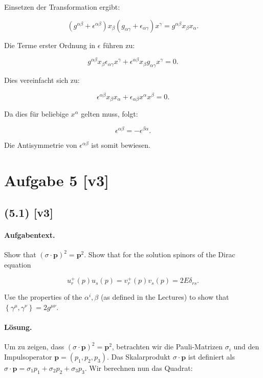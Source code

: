 \documentclass[11pt,a4paper]{article}
\begin{document}
Einsetzen der Transformation ergibt:

\[
\left(g^{\alpha \beta} + \epsilon^{\alpha \beta}\right) x_\beta \left(g_{\alpha \gamma} + \epsilon_{\alpha \gamma}\right) x^\gamma = g^{\alpha \beta} x_\beta x_\alpha.
\]

Die Terme erster Ordnung in $\epsilon$ führen zu:

\[
g^{\alpha \beta} x_\beta \epsilon_{\alpha \gamma} x^\gamma + \epsilon^{\alpha \beta} x_\beta g_{\alpha \gamma} x^\gamma = 0.
\]

Dies vereinfacht sich zu:

\[
\epsilon^{\alpha \beta} x_\beta x_\alpha + \epsilon_{\alpha \beta} x^\alpha x^\beta = 0.
\]

Da dies für beliebige $x^\alpha$ gelten muss, folgt:

\[
\epsilon^{\alpha \beta} = -\epsilon^{\beta \alpha}.
\]

Die Antisymmetrie von $\epsilon^{\alpha \beta}$ ist somit bewiesen.

\section*{Aufgabe 5 [v3]}
\subsection*{(5.1) [v3]}
\paragraph{Aufgabentext.}
Show that $(\sigma \cdot \mathbf{p})^2=\mathbf{p}^2$. Show that for the solution spinors of the Dirac equation

$$
u_r^{+}(p) u_s(p)=v_r^{+}(p) v_s(p)=2 E \delta_{r s} .
$$


Use the properties of the $\alpha^i, \beta$ (as defined in the Lectures) to show that $\left\{\gamma^\mu, \gamma^\nu\right\}=2 g^{\mu \nu}$.

\paragraph{Lösung.}
Um zu zeigen, dass $(\sigma \cdot \mathbf{p})^2 = \mathbf{p}^2$, betrachten wir die Pauli-Matrizen $\sigma_i$ und den Impulsoperator $\mathbf{p} = (p_1, p_2, p_3)$. Das Skalarprodukt $\sigma \cdot \mathbf{p}$ ist definiert als $\sigma \cdot \mathbf{p} = \sigma_1 p_1 + \sigma_2 p_2 + \sigma_3 p_3$. Wir berechnen nun das Quadrat:
\end{document}
